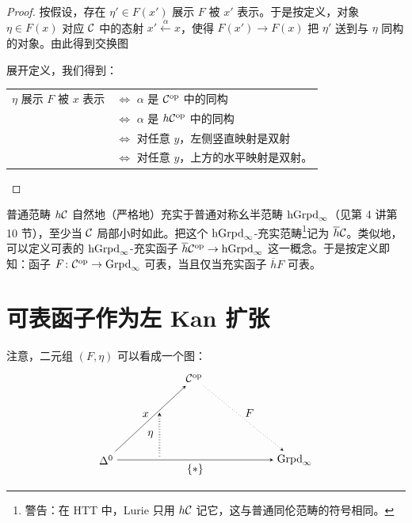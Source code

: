 \begin{proof}
按假设，存在 $\eta'\in F(x')$ 展示 $F$ 被 $x'$ 表示。于是按定义，对象 $\eta\in F(x)$ 对应 $\mathcal{C}$ 中的态射 $x'\xleftarrow{\ \alpha\ }x$，使得 $F(x')\to F(x)$ 把 $\eta'$ 送到与 $\eta$ 同构的对象。由此得到交换图
\begin{center}
\end{center}
展开定义，我们得到：
\begin{center}
\begin{tabular}{ll}
$\eta$ 展示 $F$ 被 $x$ 表示 & $\Leftrightarrow$ $\alpha$ 是 $\mathcal{C}^{\mathrm{op}}$ 中的同构\\
 & $\Leftrightarrow$ $\alpha$ 是 $h\mathcal{C}^{\mathrm{op}}$ 中的同构\\
 & $\Leftrightarrow$ 对任意 $y$，左侧竖直映射是双射\\
 & $\Leftrightarrow$ 对任意 $y$，上方的水平映射是双射。
\end{tabular}
\end{center}
\end{proof}

\begin{remark}\label{L11-1.12}
普通范畴 $h\mathcal{C}$ 自然地（严格地）充实于普通对称幺半范畴 $\operatorname{hGrpd}_\infty$（见第 4 讲第 10 节），至少当 $\mathcal{C}$ 局部小时如此。把这个 $\operatorname{hGrpd}_\infty$-充实范畴\footnote{警告：在 HTT 中，Lurie 只用 $h\mathcal{C}$ 记它，这与普通同伦范畴的符号相同。}记为 $\overline{h}\mathcal{C}$。类似地，可以定义可表的 $\operatorname{hGrpd}_\infty$-充实函子 $\overline{h}\mathcal{C}^{\mathrm{op}}\to\operatorname{hGrpd}_\infty$ 这一概念。于是按定义即知：函子 $F\colon\mathcal{C}^{\mathrm{op}}\to\operatorname{Grpd}_\infty$ 可表，当且仅当充实函子 $\overline{h}F$ 可表。
\end{remark}

\section{可表函子作为左 Kan 扩张}

\nitem\label{L11-2.1} 注意，二元组 $(F,\eta)$ 可以看成一个图：
\begin{equation}\label{L11-eq2.1}
\begin{tikzpicture}[>=stealth,baseline=(current bounding box.center)]
\node (D) at (0,0) {$\Delta^0$};
\node (C) at (2.8,2.6) {$\cC^{\op}$};
\node (G) at (6,0) {$\Grpd_\infty$};
\draw[->] (D) -- (C) node[midway,above left=-2pt] {$x$};
\draw[->] (D) -- (G) node[midway,below] {$\{\ast\}$};
\draw[->,dotted] (C) -- (G) node[midway,above right=-2pt] {$F$};
\draw[double,->,dotted] (1.7,0.12) -- (1.7,1.5) node[midway,left=2pt] {$\eta$};
\end{tikzpicture}
\end{equation}


